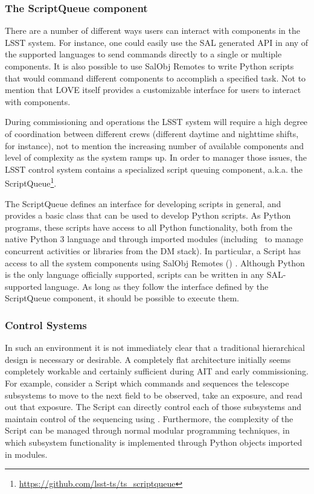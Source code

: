 \subsubsection{The ScriptQueue component} \label{sect:scriptq}
There are a number of different ways users can interact with components in the LSST system. For instance, one could easily use the SAL generated API in any of the supported languages to send commands directly to a single or multiple components. It is also possible to use SalObj Remotes to write Python scripts that would command different components to accomplish a specified task. Not to mention that LOVE itself provides a customizable interface for users to interact with components.

During commissioning and operations the LSST system will require a high degree of coordination between different crews (different daytime and nighttime shifts, for instance), not to mention the increasing number of available components and level of complexity as the system ramps up. In order to manager those issues, the LSST control system contains a specialized script queuing component, a.k.a. the ScriptQueue\footnote{\url{https://github.com/lsst-ts/ts_scriptqueue}}.

The ScriptQueue defines an interface for developing scripts in general, and provides a basic class that can be used to develop Python scripts. As Python programs, these scripts have access to all Python functionality, both from the native Python 3 language and through imported modules (including \asyncio~to manage concurrent activities or libraries from the DM stack). In particular, a Script has access to all the system components using SalObj Remotes () . Although Python is the only language officially supported, scripts can be written in any SAL-supported language. As long as they follow the interface defined by the ScriptQueue component, it should be possible to execute them.

\subsubsection{Control Systems} \label{sect:ocs}
In such an environment it is not immediately clear that a traditional hierarchical design is necessary or desirable. A completely flat architecture initially seems completely workable and certainly sufficient during AIT and early commissioning. For example, consider a Script which commands and sequences the telescope subsystems to move to the next field to be observed, take an exposure, and read out that exposure. The Script can directly control each of those subsystems and maintain control of the sequencing using \asyncio. Furthermore, the complexity of the Script can be managed through normal modular programming techniques, in which subsystem functionality is implemented through Python objects imported in modules.

